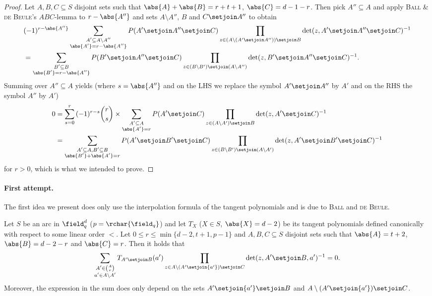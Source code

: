 \message{ !name(OnTheRAIDProblem.tex)}\documentclass[8pt,a4paper]{article}
\begin{document}
\begin{proof}
Let $A,B,C\subseteq S$ disjoint sets such
that $\abs{A}+\abs{B}=r+t+1$, $\abs{C}=d-1-r$. Then pick $A''\subseteq
A$ and apply \textsc{Ball \& de Beule}'s $ABC$-lemma to
$r-\abs{A''}$ and sets $A\setminus A''$, $B$ and $C\setjoin A''$ to
obtain
\begin{align}
 &(-1)^{r-\abs{A''}}\sum_{\substack{A'\subseteq A\setminus A''\\
     \abs{A'}=r-\abs{A''}}}{P(A'\setjoin A''\setjoin C)\prod_{z\in
     (A\setminus (A'\setjoin A''))\setjoin B}{\det(z,A'\setjoin A''\setjoin C)^{-1}}}\\
 &= \sum_{\substack{B'\subseteq B\\
     \abs{B'}=r-\abs{A''}}}{P(B'\setjoin A''\setjoin C)\prod_{z\in
     (B\setminus B')\setjoin (A\setminus A'')}{\det(z,B'\setjoin A''\setjoin C)^{-1}}}\text{.}
\end{align} 
Summing over $A''\subseteq A$ yields (where $s=\abs{A''}$ and on the
LHS we replace the symbol $A'\setjoin A''$ by $A'$ and on the RHS the
symbol $A''$ by $A'$)
\begin{align}
 0 &= \sum_{s=0}^r{(-1)^{r-s}\binom{r}{s}}\times\sum_{\substack{A'\subseteq A\\ \abs{A'}=r}}{P(A'\setjoin C)\prod_{z\in
     (A\setminus A')\setjoin B}{\det(z,A'\setjoin C)^{-1}}}\\
 &= \sum_{\substack{A'\subseteq A, B'\subseteq B\\
     \abs{B'}+\abs{A'}=r}}{P(A'\setjoin B'\setjoin C)\prod_{z\in
     (B\setminus B')\setjoin (A\setminus A')}{\det(z,A'\setjoin B'\setjoin C)^{-1}}}
\end{align}
for $r>0$, which is what we intended to prove.
\end{proof}

\paragraph{First attempt.} The first idea we present does only use the interpolation formula of
the tangent polynomials and is due to \textsc{Ball} and
\textsc{de Beule}.

\begin{lemma}
Let $S$ be an arc in $\field_q^d$ ($p=\rchar{\field_q}$) and let $T_X$
($X\in S$, $\abs{X}=d-2$) be its tangent polynomials defined canonically with respect to some linear order $<$. Let $0\leq r\leq\min\{d-2,t+1,p-1\}$ and $A,B,C\subseteq S$ disjoint sets such that $\abs{A}=t+2$, $\abs{B}=d-2-r$ and $\abs{C}=r$. Then it holds that
\begin{equation}
\sum_{\substack{A'\in\binom{A}{r}\\ a'\in A\setminus A'}}{T_{A'\setjoin B}(a')\prod_{z\in A\setminus (A'\setjoin\{a'\})\setjoin C}\det(z,A'\setjoin B,a')^{-1}}=0\text{.}
\end{equation}
Moreover, the expression in the sum does only depend on the sets $A'\setjoin\{a'\}\setjoin B$ and $A\setminus (A'\setjoin\{a'\})\setjoin C$.
\end{lemma}
\end{document}
